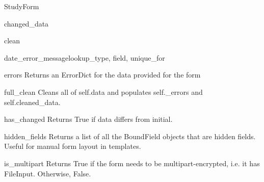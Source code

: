 \documentclass[letterpaper,10pt,english]{sphinxmanual}
\begin{document}
\begin{classdesc}{StudyForm}
\hypertarget{data.forms.StudyForm.changed_data}{}\begin{memberdesc}[StudyForm]{changed\_data}\end{memberdesc}

\hypertarget{data.forms.StudyForm.clean}{}\begin{methoddesc}[StudyForm]{clean}{}\end{methoddesc}

\hypertarget{data.forms.StudyForm.date_error_message}{}\begin{methoddesc}[StudyForm]{date\_error\_message}{lookup\_type, field, unique\_for}\end{methoddesc}

\hypertarget{data.forms.StudyForm.errors}{}\begin{memberdesc}[StudyForm]{errors}
Returns an ErrorDict for the data provided for the form
\end{memberdesc}

\hypertarget{data.forms.StudyForm.full_clean}{}\begin{methoddesc}[StudyForm]{full\_clean}{}
Cleans all of self.data and populates self.\_errors and
self.cleaned\_data.
\end{methoddesc}

\hypertarget{data.forms.StudyForm.has_changed}{}\begin{methoddesc}[StudyForm]{has\_changed}{}
Returns True if data differs from initial.
\end{methoddesc}

\hypertarget{data.forms.StudyForm.hidden_fields}{}\begin{methoddesc}[StudyForm]{hidden\_fields}{}
Returns a list of all the BoundField objects that are hidden fields.
Useful for manual form layout in templates.
\end{methoddesc}

\hypertarget{data.forms.StudyForm.is_multipart}{}\begin{methoddesc}[StudyForm]{is\_multipart}{}
Returns True if the form needs to be multipart-encrypted, i.e. it has
FileInput. Otherwise, False.
\end{methoddesc}


\end{classdesc}
\end{document}
